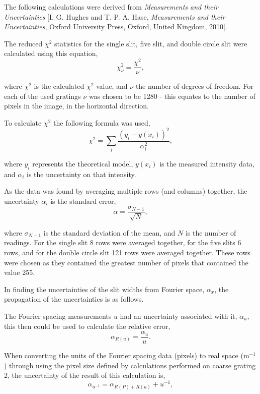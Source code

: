 \documentclass[twocolumn]{revtex4}
\begin{document}
The following calculations were derived from \textit{Measurements and their Uncertainties} [I. G. Hughes and T. P. A. Hase, \textit{Measurements and their Uncertainties}, Oxford University Press, Oxford, United Kingdom, 2010].

The reduced $\chi^2$ statistics for the single slit, five slit, and double circle slit were calculated using this equation,
\begin{equation}
\chi^2_\nu = \frac{\chi^2}{\nu},
\end{equation}

where $\chi^2$ is the calculated $\chi^2$ value, and $\nu$ the number of degrees of freedom. For each of the used gratings $\nu$ was chosen to be 1280 - this equates to the number of pixels in the image, in the horizontal direction.

To calculate $\chi^2$ the following formula was used,
\begin{equation}
\chi^2 = \sum_i \frac{(y_i -y(x_i))^2}{\alpha_i^2},
\end{equation}

where $y_i$ represents the theoretical model, $y(x_i)$ is the measured intensity data, and $\alpha_i$ is the uncertainty on that intensity.

As the data was found by averaging multiple rows (and columns) together, the uncertainty $\alpha_i$ is the standard error,
\begin{equation}
\alpha=\frac{\sigma_{N-1}}{\sqrt{N}},
\end{equation}

where $\sigma_{N-1}$ is the standard deviation of the mean, and $N$ is the number of readings. For the single slit 8 rows were averaged together, for the five slits 6 rows, and for the double circle slit 121 rows were averaged together. These rows were chosen as they contained the greatest number of pixels that contained the value 255. 

In finding the uncertainties of the slit widths from Fourier space, $\alpha_x$, the propagation of the uncertainties is as follows. 

The Fourier spacing measurements $u$ had an uncertainty associated with it, $\alpha_u$, this then could be used to calculate the relative error, 
\begin{equation}
\alpha_{R(u)}=\frac{\alpha_u}{u}.
\end{equation}

When converting the units of the Fourier spacing data (pixels) to real space (m$^{-1}$) through using the pixel size defined by calculations performed on coarse grating 2, the uncertainty of the result of this calculation is,
\begin{equation}
\alpha_{u^{-1}}=\alpha_{R(P)+R(u)}+{u^{-1}},
\end{equation}
\end{document}
